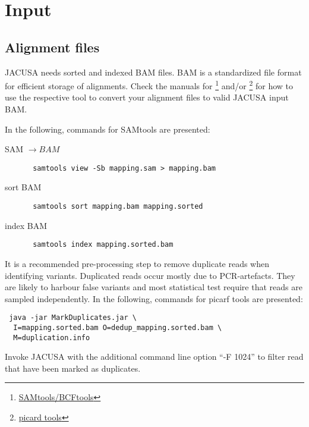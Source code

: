 \documentclass[10pt, a4paper]{article}
\begin{document}
\section{Input}
\subsection{Alignment files}
JACUSA needs sorted and indexed BAM files. BAM is a standardized file format for
efficient storage of alignments. Check the manuals for
\footnote{\href{http://samtools.sourceforge.net/}{SAMtools/BCFtools}} and/or
\footnote{\href{http://broadinstitute.github.io/picard/}{picard tools}} for how to use the
respective tool to convert your alignment files to valid JACUSA input BAM.

In the following, commands for SAMtools are presented:
\begin{description}
\item[SAM $\rightarrow BAM$] \begin{verbatim} samtools view -Sb mapping.sam > mapping.bam \end{verbatim}
\item[sort BAM] \begin{verbatim} samtools sort mapping.bam mapping.sorted \end{verbatim} 
\item[index BAM] \begin{verbatim} samtools index mapping.sorted.bam \end{verbatim}
\end{description}

It is a recommended pre-processing step to remove duplicate reads when identifying variants.
Duplicated reads occur mostly due to PCR-artefacts. 
They are likely to harbour false variants and most statistical test require that reads are sampled independently.  
In the following, commands for picarf tools are presented:
\begin{verbatim} java -jar MarkDuplicates.jar \ 
  I=mapping.sorted.bam O=dedup_mapping.sorted.bam \ 
  M=duplication.info
\end{verbatim}
Invoke JACUSA with the additional command line option ``-F 1024'' to filter read that have been marked as duplicates.
\end{document}
